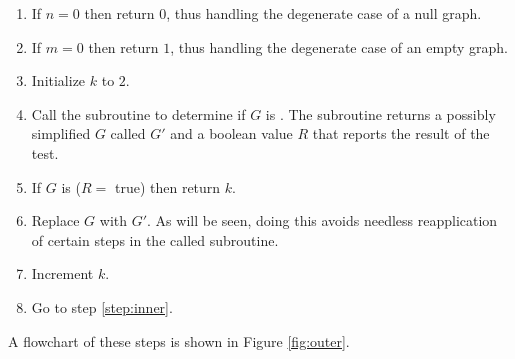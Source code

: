 \begin{enumerate}
\item \label{step:null} If \(n=0\) then return \(0\), thus handling the degenerate case of a null graph.

\item \label{step:one} If \(m=0\) then return \(1\), thus handling the degenerate case of an empty graph.

\item \label{step:init} Initialize \(k\) to \(2\).

\item \label{step:inner} Call the subroutine to determine if \(G\) is .  The subroutine returns a
  possibly simplified \(G\) called \(G'\) and a boolean value \(R\) that reports the result of the test.

\item \label{step:call} If \(G\) is  (\(R=\) true) then return \(k\).

\item \label{step:newg} Replace \(G\) with \(G'\).  As will be seen, doing this avoids needless reapplication of
  certain steps in the called subroutine.

\item \label{step:incr} Increment \(k\).

\item \label{step:loop} Go to step \ref{step:inner}.
\end{enumerate}

A flowchart of these steps is shown in Figure \ref{fig:outer}.

